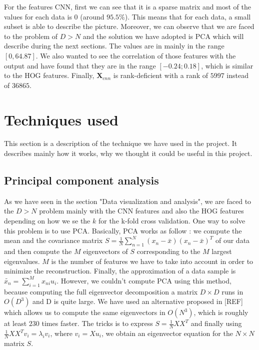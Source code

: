 \documentclass{article} %
\begin{document}
For the features CNN, first we can see that it is a sparse matrix and most of the values for each data is $0$ (around $95.5\%$). This means that for each data, a small subset is able to describe the picture. Moreover, we can observe that we are faced to the problem of $D > N$ and the solution we have adopted is PCA which will describe during the next sections. The values are in mainly in the range $[0, 64.87]$. We also wanted to see the correlation of those features with the output and have found that they are in the range $[-0.24;0.18]$, which is similar to the HOG features. Finally,  $\mathbf{X}_{cnn}$ is rank-deficient with a rank of $5997$ instead of $36865$.

\section{Techniques used}

This section is a description of the technique we have used in the project. It describes mainly how it works, why we thought it could be useful in this project.

\subsection{Principal component analysis}

As we have seen in the section "Data visualization and analysis", we are faced to the $D > N$ problem mainly with the CNN features and also the HOG features depending on how we se the $k$ for the k-fold cross validation. One way to solve this problem is to use PCA.  Basically, PCA works as follow : we compute the mean and the covariance matrix $S = \frac{1}{N}\sum_{n=1}^{N}(x_n-\bar{x})(x_n-\bar{x})^T$ of our data and then compute the $M$ eigenvectors of $S$ corresponding to the $M$ largest eigenvalues. $M$ is the number of features we have to take into account in order to minimize the reconstruction. Finally, the approximation of a data sample is $\tilde{x_n} = \sum_{i=1}^M x_{ni} u_i$. However, we couldn't compute PCA using this method, because computing the full eigenvector decomposition a matrix $D \times D$ runs in  $O(D^3)$ and D is quite large. 
We have used an alternative proposed in [REF] which allows us to compute the same eigenvectors in $O(N^3)$, which is roughly at least $230$ times faster. The tricks is to express $S = \frac{1}{N}XX^T$ and finally using $\frac{1}{N}XX^Tv_i = \lambda_i v_i$, where $v_i=Xu_i$, we obtain an eigenvector equation for the $N \times N$ matrix $S$.
\end{document}
